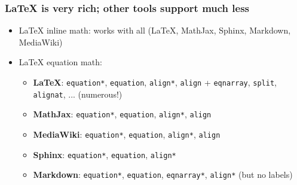 \documentclass{beamer}
\begin{document}
\begin{frame}
\frametitle{{\LaTeX} is very rich; other tools support much less}

\begin{itemize}
 \item {\LaTeX} inline math: works with all ({\LaTeX}, MathJax, Sphinx, Markdown, MediaWiki)

 \item {\LaTeX} equation math:
\begin{itemize}

    \item \textbf{LaTeX}: \Verb!equation*!, \Verb!equation!, \Verb!align*!, \Verb!align! +
      \Verb!eqnarray!, \Verb!split!, \Verb!alignat!, ... (numerous!)

    \item \textbf{MathJax}: \Verb!equation*!, \Verb!equation!, \Verb!align*!, \Verb!align!

    \item \textbf{MediaWiki}: \Verb!equation*!, \Verb!equation!, \Verb!align*!, \Verb!align!

    \item \textbf{Sphinx}: \Verb!equation*!, \Verb!equation!, \Verb!align*!

    \item \textbf{Markdown}: \Verb!equation*!, \Verb!equation!, \Verb!eqnarray*!, \Verb!align*! (but no labels)
\end{itemize}

\noindent
\end{itemize}

\noindent
\end{frame}
\end{document}
